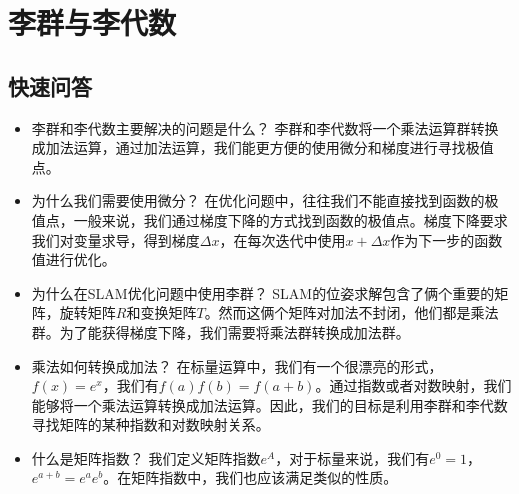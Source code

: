 \section{李群与李代数}


\subsection{快速问答}
\begin{itemize}
    \item 李群和李代数主要解决的问题是什么？{\color{blue} 李群和李代数将一个乘法运算群转换成加法运算，通过加法运算，我们能更方便的使用微分和梯度进行寻找极值点。}
    \item 为什么我们需要使用微分？{\color{blue} 在优化问题中，往往我们不能直接找到函数的极值点，一般来说，我们通过梯度下降的方式找到函数的极值点。梯度下降要求我们对变量求导，得到梯度\(\Delta x\)，在每次迭代中使用\(x+\Delta x\)作为下一步的函数值进行优化。}
    \item 为什么在SLAM优化问题中使用李群？{\color{blue} SLAM的位姿求解包含了俩个重要的矩阵，旋转矩阵\(R\)和变换矩阵\(T\)。然而这俩个矩阵对加法不封闭，他们都是乘法群。为了能获得梯度下降，我们需要将乘法群转换成加法群。}
    \item 乘法如何转换成加法？{\color{blue} 在标量运算中，我们有一个很漂亮的形式，\(f(x)=e^x\)，我们有\(f(a)f(b)=f(a+b)\)。通过指数或者对数映射，我们能够将一个乘法运算转换成加法运算。因此，我们的目标是利用李群和李代数寻找矩阵的某种指数和对数映射关系。}
    \item 什么是矩阵指数？{\color{blue} 我们定义矩阵指数\(e^A\)，对于标量来说，我们有\(e^0=1\)，\(e^{a+b}=e^ae^b\)。在矩阵指数中，我们也应该满足类似的性质。}
\end{itemize}



